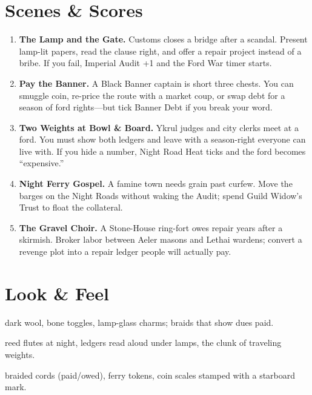\documentclass[11pt,letterpaper]{article}
\begin{document}
\section{Scenes \& Scores}

\begin{enumerate}
\item \textbf{The Lamp and the Gate.} Customs closes a bridge after a scandal. Present lamp-lit papers, read the clause right, and offer a repair project instead of a bribe. If you fail, Imperial Audit +1 and the Ford War timer starts.

\item \textbf{Pay the Banner.} A Black Banner captain is short three chests. You can smuggle coin, re-price the route with a market coup, or swap debt for a season of ford rights---but tick Banner Debt if you break your word.

\item \textbf{Two Weights at Bowl \& Board.} Ykrul judges and city clerks meet at a ford. You must show both ledgers and leave with a season-right everyone can live with. If you hide a number, Night Road Heat ticks and the ford becomes ``expensive.''

\item \textbf{Night Ferry Gospel.} A famine town needs grain past curfew. Move the barges on the Night Roads without waking the Audit; spend Guild Widow's Trust to float the collateral.

\item \textbf{The Gravel Choir.} A Stone-House ring-fort owes repair years after a skirmish. Broker labor between Aeler masons and Lethai wardens; convert a revenge plot into a repair ledger people will actually pay.
\end{enumerate}

\section{Look \& Feel}

\begin{description}[leftmargin=*]
\item[Dress] dark wool, bone toggles, lamp-glass charms; braids that show dues paid.
\item[Sound] reed flutes at night, ledgers read aloud under lamps, the clunk of traveling weights.
\item[Symbols] braided cords (paid/owed), ferry tokens, coin scales stamped with a starboard mark.
\end{description}
\end{document}
